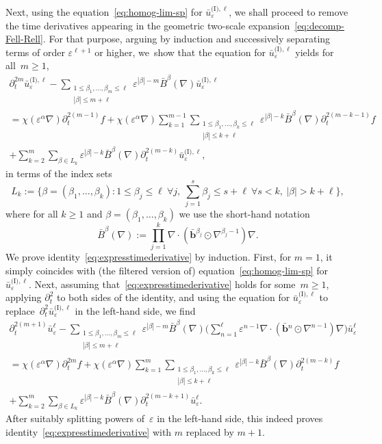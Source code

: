 \documentclass[JEP,XML,SOM,Unicode,published]{cedram}
\theoremstyle{plain}
\theoremstyle{definition}
\numberwithin{equation}{section}
\newcommand{\e}{\varepsilon}
\newcommand{\bb}{{\boldsymbol b}}
\begin{document}
Next, using the equation~\eqref{eq:homog-lim-sp} for $\bar{u}_{\e}^{\text{(I)},\ell}$, we shall proceed to remove the time derivatives appearing in the geometric two-scale expansion~\eqref{eq:decomp-Fell-Rell}.
For that purpose, argu\-ing by induction and successively {separating} terms of order $\e^{\ell+1}$ or higher, we~show that the equation for $\bar{u}_{\e}^{\text{(I)},\ell}$ yields for all~$m\ge1$,
\begin{multline}\label{eq:expresstimederivative}
\partial_t^{2m} \bar{u}^{\text{(I)},\ell}_{\e}-\sum_{\substack{1\le \beta_1,\ldots,\beta_m\le \ell\\|\beta|\le m+\ell}}\e^{|\beta|-m}\bar B^\beta(\nabla)\bar{u}^{\text{(I)},\ell}_{\e}\\
=\chi(\e^{\alpha}\nabla)\partial_t^{2(m-1)}f+\chi(\e^{\alpha}\nabla)\sum_{k=1}^{m-1}\sum_{\substack{1\le \beta_1,\ldots,\beta_k\le\ell\\|\beta|\le k+\ell}}\e^{|\beta|-k}\bar B^\beta(\nabla)\partial_t^{2(m-k-1)}f\\
+\sum_{k=2}^m\sum_{\beta\in L_k}\e^{|\beta|-k}\bar B^\beta(\nabla)\partial_t^{2(m-k)}\bar u^{\text{(I)},\ell}_\e,
\end{multline}
in terms of the index sets
\[L_k:=\Big\{\beta=(\beta_1,\dots,\beta_k):1\le\beta_j\le\ell~\forall j,~\sum_{j=1}^s\beta_j\le s+\ell~\forall s<k,~|\beta|>k+\ell\Big\},\]
where for all $k\ge1$ and $\beta=(\beta_1,\ldots,\beta_k)$ we use the short-hand notation
\begin{equation}\label{eq:not-bigBb}
\bar{B}^\beta(\nabla):=\prod_{j=1}^k\nabla\cdot(\bar\bb{}^{\beta_j}\odot\nabla^{\beta_j-1})\nabla.
\end{equation}
We prove identity~\eqref{eq:expresstimederivative} by induction.
First, for $m=1$, it simply coincides with (the filtered version of) equation~\eqref{eq:homog-lim-sp} for $\bar{u}_{\e}^{\text{(I)},\ell}$.
Next, assuming that~\eqref{eq:expresstimederivative} holds for some~$m\ge1$, applying $\partial_t^2$ to both sides of the identity, and using the equation for $\bar{u}_{\e}^{\text{(I)},\ell}$ to replace~$\partial_t^2\bar{u}_{\e}^{\text{(I)},\ell}$ in the left-hand side, we find
\begin{multline*}
\partial_t^{2(m+1)} \bar{u}^{\ell}_{\e}-\sum_{\substack{1\le \beta_1,\ldots,\beta_m\le \ell\\|\beta|\le m+\ell}}\e^{|\beta|-m}\bar B^\beta(\nabla)\Big(\sum_{n=1}^\ell\e^{n-1}\nabla\cdot(\bar\bb{}^n\odot\nabla^{n-1})\nabla\Big)\bar{u}^{\ell}_{\e}\\
=\chi(\e^{\alpha}\nabla)\partial_t^{2m}f+\chi(\e^{\alpha}\nabla)\sum_{k=1}^{m}\sum_{\substack{1\le \beta_1,\ldots,\beta_k\le\ell\\|\beta|\le k+\ell}}\e^{|\beta|-k}\bar B^\beta(\nabla)\partial_t^{2(m-k)}f\\
+\sum_{k=2}^m\sum_{\beta\in L_k}\e^{|\beta|-k}\bar B^\beta(\nabla)\partial_t^{2(m-k+1)}\bar u^\ell_\e.
\end{multline*}
After suitably splitting powers of~$\e$ in the left-hand side, this indeed proves identity~\eqref{eq:expresstimederivative} with $m$ replaced by $m+1$.
\end{document}
